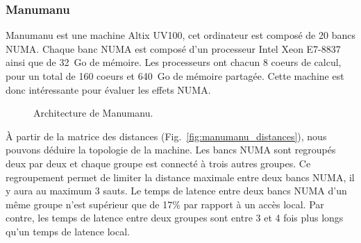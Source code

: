 \subsubsection{Manumanu}
Manumanu est une machine Altix UV100, cet ordinateur est composé de 20 bancs NUMA.
%
Chaque banc NUMA est composé d'un processeur Intel Xeon E7-8837 ainsi que de 32~Go de mémoire.
%
Les processeurs ont chacun 8 coeurs de calcul, pour un total de 160 coeurs et 640~Go de mémoire partagée.
%
Cette machine est donc intéressante pour évaluer les effets NUMA.
\begin{figure}[!h]
     \begin{center}
    \end{center}
    \caption{Architecture de Manumanu.}
    \label{fig:manumanu}
\end{figure}
\`{A} partir de la matrice des distances (Fig.~\ref{fig:manumanu_distances}), nous pouvons déduire la topologie de la machine.
%
Les bancs NUMA sont regroupés deux par deux et chaque groupe est connecté à trois autres groupes.
%
Ce regroupement permet de limiter la distance maximale entre deux bancs NUMA, il y aura au maximum 3 sauts.
%
Le temps de latence entre deux bancs NUMA d'un même groupe n'est supérieur que de 17\% par rapport à un accès local.
%
Par contre, les temps de latence entre deux groupes sont entre 3 et 4 fois plus longs qu'un temps de latence local.
